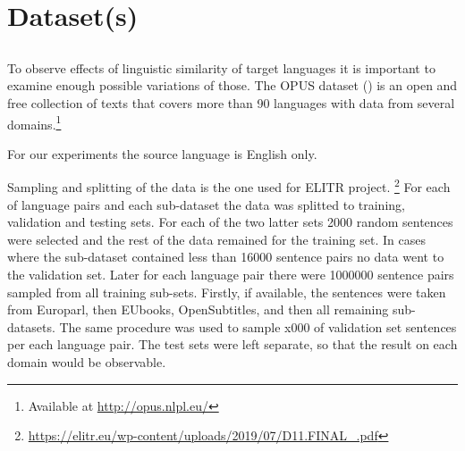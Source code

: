% 





\section{Dataset(s)}
\label{section:datasets}


\subsection{}
\label{subsection:en-to-36}

To observe effects of linguistic similarity of target languages
it is important to examine enough possible variations of those.
The OPUS dataset (\cite{TIEDEMANN12.463}) is an open and free collection of texts
that covers more than 90 languages with data from several
domains.\footnote{Available at \url{http://opus.nlpl.eu/}} 

For our experiments the source language is English only.

Sampling and splitting of the data is the one used for
ELITR project.%
\footnote{\url{https://elitr.eu/wp-content/uploads/2019/07/D11.FINAL\_.pdf}}
For each of language pairs and each sub-dataset
the data was splitted to training, validation and testing sets.
For each of the two latter sets 2000 random sentences were selected
and the rest of the data remained for the training set.
In cases where the sub-dataset contained less than 16000 sentence pairs
no data went to the validation set.
Later for each language pair there were 1000000 sentence pairs
sampled from all training sub-sets.
Firstly, if available, the sentences were taken from Europarl,
then EUbooks, OpenSubtitles, and then all remaining sub-datasets.
The same procedure was used to sample x000 of validation set sentences
per each language pair.
The test sets were left separate, so that the result on each domain would be observable.

